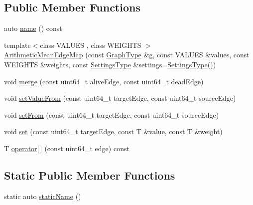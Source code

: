 \subsection*{Public Member Functions}
\begin{DoxyCompactItemize}
\item 
auto \hyperlink{classnifty_1_1graph_1_1agglo_1_1merge__rules_1_1ArithmeticMeanEdgeMap_a4a3138619d92afa12e883b09d538896a}{name} () const
\item 
{\footnotesize template$<$class V\+A\+L\+U\+ES , class W\+E\+I\+G\+H\+TS $>$ }\\\hyperlink{classnifty_1_1graph_1_1agglo_1_1merge__rules_1_1ArithmeticMeanEdgeMap_ae92e301804e5bf9b875517f97e225d5d}{Arithmetic\+Mean\+Edge\+Map} (const \hyperlink{classnifty_1_1graph_1_1agglo_1_1merge__rules_1_1ArithmeticMeanEdgeMap_a920251c7296554c793d991a09938cc0f}{Graph\+Type} \&g, const V\+A\+L\+U\+ES \&values, const W\+E\+I\+G\+H\+TS \&weights, const \hyperlink{classnifty_1_1graph_1_1agglo_1_1merge__rules_1_1ArithmeticMeanEdgeMap_a356668f9c14aae4ff88d90a232923766}{Settings\+Type} \&settings=\hyperlink{classnifty_1_1graph_1_1agglo_1_1merge__rules_1_1ArithmeticMeanEdgeMap_a356668f9c14aae4ff88d90a232923766}{Settings\+Type}())
\item 
void \hyperlink{classnifty_1_1graph_1_1agglo_1_1merge__rules_1_1ArithmeticMeanEdgeMap_a800c49f685e5e9d538c4882d3850bf25}{merge} (const uint64\+\_\+t alive\+Edge, const uint64\+\_\+t dead\+Edge)
\item 
void \hyperlink{classnifty_1_1graph_1_1agglo_1_1merge__rules_1_1ArithmeticMeanEdgeMap_ab8cb13b03ece7afe026a3423cc1d91aa}{set\+Value\+From} (const uint64\+\_\+t target\+Edge, const uint64\+\_\+t source\+Edge)
\item 
void \hyperlink{classnifty_1_1graph_1_1agglo_1_1merge__rules_1_1ArithmeticMeanEdgeMap_a24503113d90f0294a8a16ad7b9553dfd}{set\+From} (const uint64\+\_\+t target\+Edge, const uint64\+\_\+t source\+Edge)
\item 
void \hyperlink{classnifty_1_1graph_1_1agglo_1_1merge__rules_1_1ArithmeticMeanEdgeMap_ac3b18557bfdd68a5f85fccf700da5c5e}{set} (const uint64\+\_\+t target\+Edge, const T \&value, const T \&weight)
\item 
T \hyperlink{classnifty_1_1graph_1_1agglo_1_1merge__rules_1_1ArithmeticMeanEdgeMap_ad63987afccca212c9ed566d68dba3e67}{operator\mbox{[}$\,$\mbox{]}} (const uint64\+\_\+t edge) const
\end{DoxyCompactItemize}
\subsection*{Static Public Member Functions}
\begin{DoxyCompactItemize}
\item 
static auto \hyperlink{classnifty_1_1graph_1_1agglo_1_1merge__rules_1_1ArithmeticMeanEdgeMap_a566abab9594baa39a5e445c368ed24e7}{static\+Name} ()
\end{DoxyCompactItemize}


